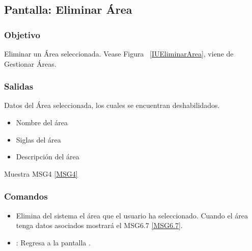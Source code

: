 \subsection{Pantalla: Eliminar Área}

\subsubsection{Objetivo}
Eliminar un Área seleccionada. Vease Figura ~\ref{IUEliminarArea}, viene de Gestionar Áreas.


\subsubsection{Salidas}
Datos del Área seleccionada, los cuales se encuentran deshabilidados.
\begin{itemize}
 \item Nombre del área
 \item Siglas del área
 \item Descripción del área
\end{itemize}
Muestra MSG4 \ref{MSG4}

\subsubsection{Comandos}
\begin{itemize}
 \item {} Elimina del sistema el área que el usuario ha seleccionado. Cuando el área tenga datos asociados mostrará el MSG6.7 \ref{MSG6.7}. 
 \item {}: Regresa a la pantalla .
\end{itemize}


